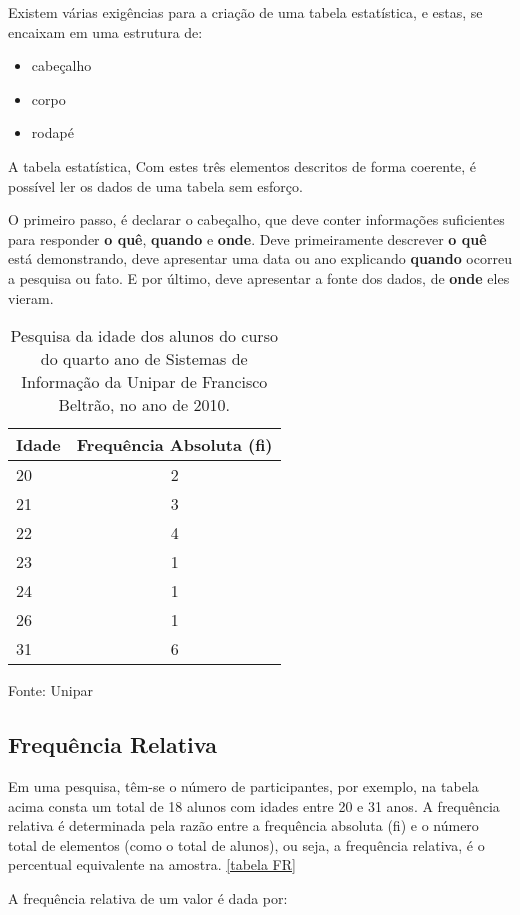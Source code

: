 \documentclass[12pt]{article}
\newcommand{\code}[1] {\textbf{#1}}
\begin{document}
Existem várias exigências para a criação de uma tabela estatística, e estas, se encaixam em uma estrutura de:


\begin{itemize} 
  \item{cabeçalho}
  \item{corpo}
  \item{rodapé}
\end{itemize} 

A tabela estatística, Com estes três elementos descritos de forma coerente, é possível ler os dados de uma tabela sem esforço. 

O primeiro passo, é declarar o cabeçalho, que deve conter informações suficientes para responder \code{o quê}, \textbf{quando} e \textbf{onde}. Deve primeiramente descrever \textbf{o quê} está demonstrando, deve apresentar uma data ou ano explicando \textbf{quando} ocorreu a pesquisa ou fato. E por último, deve apresentar a fonte dos dados, de \textbf{onde} eles vieram.

\begin{table}
\caption{Pesquisa da idade dos alunos do curso do quarto ano de Sistemas de Informação da Unipar de Francisco Beltrão, no ano de 2010.}
\begin{tabular}{|l|c|} 
\hline 
Idade & Frequência Absoluta (\code{fi}) \\ \hline 
20 & 2 \\
21 & 3 \\
22 & 4 \\
23 & 1 \\
24 & 1 \\
26 & 1 \\
31 & 6 \\ 
\hline 
\end{tabular}
\small{Fonte: Unipar}
\end{table}

\subsection { Frequência Relativa }


Em uma pesquisa, têm-se o número de participantes, por exemplo, na tabela acima consta um total de 18 alunos com idades entre 20 e 31 anos. A frequência relativa é determinada pela razão entre a frequência absoluta (fi) e o número total de elementos (como o total de alunos), ou seja, a frequência relativa, é o percentual equivalente na amostra. \ref{tabela FR}

A frequência relativa de um valor é dada por:
\end{document}
